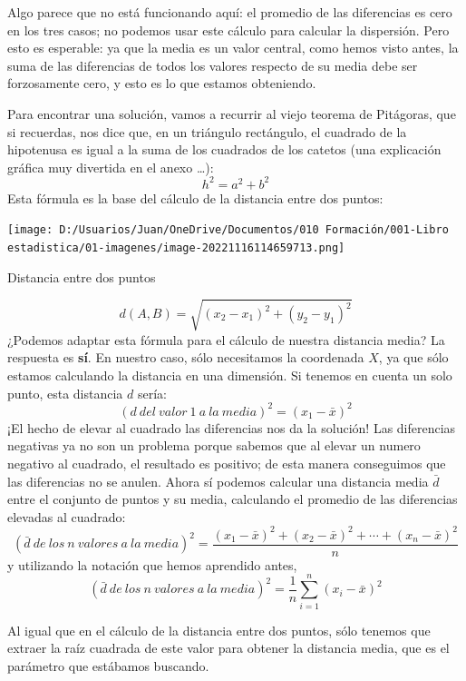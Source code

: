 \documentclass[
  letterpaper,
  DIV=11,
  numbers=noendperiod,
  oneside]{scrreprt}
\begin{document}
Algo parece que no está funcionando aquí: el promedio de las diferencias
es cero en los tres casos; no podemos usar este cálculo para calcular la
dispersión. Pero esto es esperable: ya que la media es un valor central,
como hemos visto antes, la suma de las diferencias de todos los valores
respecto de su media debe ser forzosamente cero, y esto es lo que
estamos obteniendo.

Para encontrar una solución, vamos a recurrir al viejo teorema de
Pitágoras, que si recuerdas, nos dice que, en un triángulo rectángulo,
el cuadrado de la hipotenusa es igual a la suma de los cuadrados de los
catetos (una explicación gráfica muy divertida en el anexo \ldots): \[
h^2= a^2+b^2
\] Esta fórmula es la base del cálculo de la distancia entre dos puntos:

\begin{marginfigure}

{\centering \texttt{[image: D:/Usuarios/Juan/OneDrive/Documentos/010 Formación/001-Libro estadistica/01-imagenes/image-20221116114659713.png]}

}

\caption{Distancia entre dos puntos}

\end{marginfigure}

\[
d(A,B)=\sqrt{(x_2-x_1)^2+(y_2-y_1)^2}
\] ¿Podemos adaptar esta fórmula para el cálculo de nuestra distancia
media? La respuesta es \textbf{sí}. En nuestro caso, sólo necesitamos la
coordenada \(X\), ya que sólo estamos calculando la distancia en una
dimensión. Si tenemos en cuenta un solo punto, esta distancia \(d\)
sería: \[
(d{\ }del{\ }valor{\ }1{\ }a{\ }la{\ }media)^2=(x_1-\bar{x})^2
\] ¡El hecho de elevar al cuadrado las diferencias nos da la solución!
Las diferencias negativas ya no son un problema porque sabemos que al
elevar un numero negativo al cuadrado, el resultado es positivo; de esta
manera conseguimos que las diferencias no se anulen. Ahora sí podemos
calcular una distancia media \(\bar{d}\) entre el conjunto de puntos y
su media, calculando el promedio de las diferencias elevadas al
cuadrado: \[
(\bar{d}{\ }de{\ }los{\ }n{\ }valores{\ }a{\ }la{\ }media)^2=\frac{(x_1-\bar{x})^2 + (x_2-\bar{x})^2+\cdots+(x_n-\bar{x})^2}{n}
\] y utilizando la notación que hemos aprendido antes, \[
(\bar{d}{\ }de{\ }los{\ }n{\ }valores{\ }a{\ }la{\ }media)^2={\frac {1}{n}}\sum _{i=1}^{n}(x_{i}-\bar{x})^2
\]

Al igual que en el cálculo de la distancia entre dos puntos, sólo
tenemos que extraer la raíz cuadrada de este valor para obtener la
distancia media, que es el parámetro que estábamos buscando.
\end{document}
